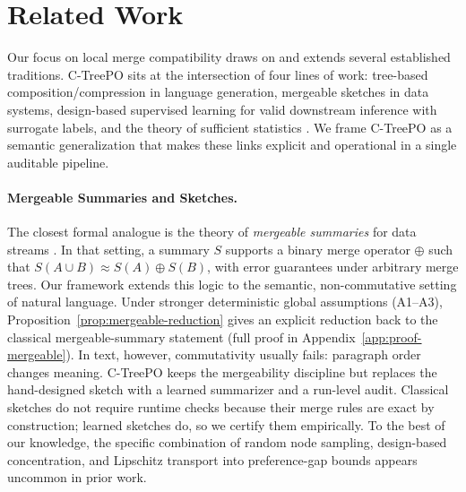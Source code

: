 \section{Related Work}\label{sec:related}

Our focus on local merge compatibility draws on and extends several established traditions. C-TreePO sits at the intersection of four lines of work: tree-based composition/compression in language generation, mergeable sketches in data systems, design-based supervised learning for valid downstream inference with surrogate labels, and the theory of sufficient statistics \citep{KuznetsovaEtAl2014TreeTalk,Agarwal2013MergeableTODS,EgamiEtAl2024,Fisher1922,Blackwell1953}. We frame C-TreePO as a semantic generalization that makes these links explicit and operational in a single auditable pipeline.

\paragraph{Mergeable Summaries and Sketches.}
The closest formal analogue is the theory of \emph{mergeable summaries} for data streams \citep{Agarwal2013MergeableTODS}. In that setting, a summary $S$ supports a binary merge operator $\oplus$ such that $S(A \cup B) \approx S(A) \oplus S(B)$, with error guarantees under arbitrary merge trees. Our framework extends this logic to the semantic, non-commutative setting of natural language. Under stronger deterministic global assumptions (A1--A3), Proposition~\ref{prop:mergeable-reduction} gives an explicit reduction back to the classical mergeable-summary statement (full proof in Appendix~\ref{app:proof-mergeable}). In text, however, commutativity usually fails: paragraph order changes meaning. C-TreePO keeps the mergeability discipline but replaces the hand-designed sketch with a learned summarizer and a run-level audit. Classical sketches do not require runtime checks because their merge rules are exact by construction; learned sketches do, so we certify them empirically. To the best of our knowledge, the specific combination of random node sampling, design-based concentration, and Lipschitz transport into preference-gap bounds appears uncommon in prior work.

